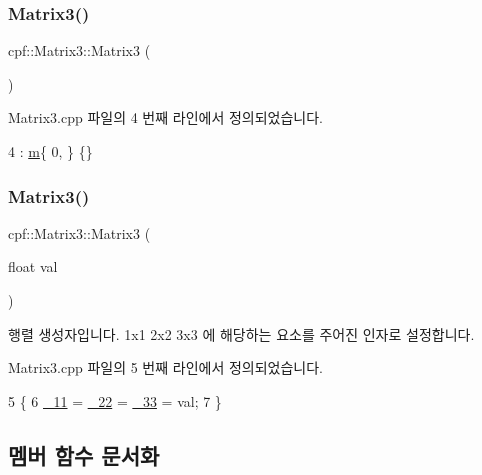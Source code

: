\subsubsection{\texorpdfstring{Matrix3()}{Matrix3()}\hspace{0.1cm}{\footnotesize\ttfamily [1/2]}}
{\footnotesize\ttfamily cpf\+::\+Matrix3\+::\+Matrix3 (\begin{DoxyParamCaption}{ }\end{DoxyParamCaption})}



Matrix3.\+cpp 파일의 4 번째 라인에서 정의되었습니다.


\begin{DoxyCode}
4 : \hyperlink{classcpf_1_1_matrix3_a544955e219e5edd0c933f5e83dde9fac}{m}\{ 0, \} \{\}
\end{DoxyCode}
\mbox{\label{classcpf_1_1_matrix3_a8f77b0fa80d6f9ce992fb88d4743b208}} 
\subsubsection{\texorpdfstring{Matrix3()}{Matrix3()}\hspace{0.1cm}{\footnotesize\ttfamily [2/2]}}
{\footnotesize\ttfamily cpf\+::\+Matrix3\+::\+Matrix3 (\begin{DoxyParamCaption}\item[{float}]{val }\end{DoxyParamCaption})}

행렬 생성자입니다. 1x1 2x2 3x3 에 해당하는 요소를 주어진 인자로 설정합니다. 

Matrix3.\+cpp 파일의 5 번째 라인에서 정의되었습니다.


\begin{DoxyCode}
5                               \{
6         \hyperlink{classcpf_1_1_matrix3_aaa10854cee95f07b839a5541c3b7bee6}{\_11} = \hyperlink{classcpf_1_1_matrix3_a6d76d826dc4990d152aac577e6d6dee9}{\_22} = \hyperlink{classcpf_1_1_matrix3_a98deb69c842744adece22e5f45d1e6d1}{\_33} = val;
7     \}
\end{DoxyCode}


\subsection{멤버 함수 문서화}
\mbox{\label{classcpf_1_1_matrix3_a6a2b12e2cba8a6f03c686a363e55934d}} 
